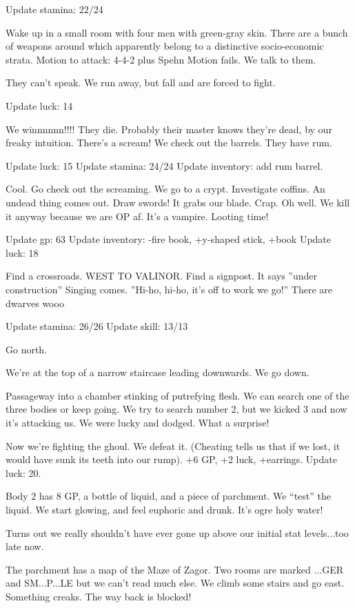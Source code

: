 \documentclass[10pt]{article}
\newcommand{\ps}{ plus Spehn\xspace}
\newcommand{\wtv}{WEST TO VALINOR}
\begin{document}
Update stamina: 22/24

Wake up in a small room with four men with green-gray skin. There are a bunch of weapons around which apparently belong to a distinctive socio-economic strata.
Motion to attack:
4-4-2\ps
Motion fails. We talk to them.

They can't speak. We run away, but fall and are forced to fight.

Update luck: 14

We winnnnnn!!!! They die. Probably their master knows they're dead, by our freaky intuition. There's a scream! We check out the barrels. They have rum.

Update luck: 15
Update stamina: 24/24
Update inventory: add rum barrel.

Cool. Go check out the screaming. We go to a crypt. Investigate coffins. An undead thing comes out. Draw swords! It grabs our blade. Crap. Oh well. We kill it anyway because we are OP af. It's a vampire. Looting time!

Update gp: 63
Update inventory: -fire book, +y-shaped stick, +book
Update luck: 18

Find a crossroads. \wtv.
Find a signpost. It says ''under construction''
Singing comes.  ''Hi-ho, hi-ho, it's off to work we go!''
There are dwarves wooo

Update stamina: 26/26
Update skill: 13/13

Go north.

We're at the top of a narrow staircase leading downwards.  We go down.

Passageway into a chamber stinking of putrefying flesh.  We can search one of the three bodies or keep going.  We try to search number 2, but we kicked 3 and now it's attacking us.  We were lucky and dodged.  What a surprise!

Now we're fighting the ghoul.  We defeat it.  (Cheating tells us that if we lost, it would have sunk its teeth into our rump).  +6 GP, +2 luck, +earrings.
Update luck:  20.

Body 2 has 8 GP, a bottle of liquid, and a piece of parchment.  We ``test'' the liquid.  We start glowing, and feel euphoric and drunk.  It's ogre holy water!

Turns out we really shouldn't have ever gone up above our initial stat levels...too late now.

The parchment has a map of the Maze of Zagor.  Two rooms are marked ...GER and SM...P...LE but we can't read much else.  We climb some stairs and go east.  Something creaks.  The way back is blocked!
\end{document}
